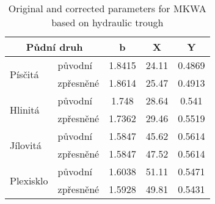 
\begin{table}[htbp]
  \centering
  \caption{Original and corrected parameters for MKWA based on hydraulic trough}
    \label{tab:puvodni}%
    \begin{tabular}{llccc}
    \hline      \hline
    
	\multicolumn{2}{c}{Půdní druh} & \multicolumn{1}{c}{b} & \multicolumn{1}{c}{X} & \multicolumn{1}{c}{Y} \\
    \hline    

	\multirow{2}[0]{*}{Písčitá} & původní & 1.8415 & 24.11 & 0.4869 \\
      & zpřesněné & 1.8614 & 25.47 & 0.4913 \\
          \hline
	\multirow{2}[0]{*}{Hlinitá} & původní & 1.748 & 28.64 & 0.541 \\
      & zpřesněné & 1.7362 & 29.46 & 0.5519 \\
          \hline
	\multirow{2}[0]{*}{Jílovitá} & původní & 1.5847 & 45.62 & 0.5614 \\
      & zpřesněné & 1.5847 & 47.52 & 0.5614 \\
          \hline
	\multirow{2}[0]{*}{Plexisklo} & původní & 1.6038 & 51.11 & 0.5471 \\
      & zpřesněné & 1.5928 & 49.81 & 0.5431 \\
          \hline     \hline
    \end{tabular}%

\end{table}%
